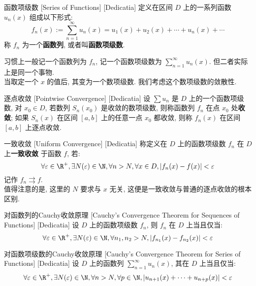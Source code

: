 \documentclass[UTF8]{ctexart}
\begin{document}
        \begin{dfn}
            [UUID]
            {函数项级数}
            [Series of Functions]
            [Dedicatia]
            定义在区间 \(D\) 上的一系列函数 \(u_n(x)\) 组成以下形式: \[f_n(x):=\sum_{n = 1}^{\infty} u_n(x)=u_1(x)+u_2(x)+\cdots+u_n(x)+\cdots \]
            称 \(f_n\) 为一个\textbf{函数列}, 或者叫\textbf{函数项级数}. 
        \end{dfn}

        习惯上一般记一个函数列为 \(f_n\), 记一个函数项级数为 \(\sum_{n = 1}^{\infty} u_n(x) \). 但二者实际上是同一个事物. \\
        当取定一个 \(x\) 的值后, 其变为一个数项级数. 我们考虑这个数项级数的敛散性. 
        
        \begin{dfn}
            [UUID]
            {逐点收敛}
            [Pointwise Convergence]
            [Dedicatia]
            设 \(\sum u_n\) 是 \(D\) 上的一个函数项级数, 对 \(x_0\in D\), 若数列 \(S_n(x_0)\) 是收敛的数项级数, 则称函数列 \(f_n\) 在点 \(x_0\) 处\textbf{收敛}; 如果 \(S_n(x)\) 在区间 \([a,b]\) 上的任意一点 \(x_0\) 都收敛, 则称 \(f_n(x)\) 在区间 \([a,b]\) 上逐点收敛. 
        \end{dfn}

        \begin{dfn}
            [UniformConvergence]
            {一致收敛}
            [Uniform Convergence]
            [Dedicatia]
            称定义在 \(D\) 上的函数项级数 \(f_n\) 在 \(D\) 上\textbf{一致收敛} 于函数 \(f\), 若: 
            \[\forall\varepsilon\in\R^+, \exists N(\varepsilon)\in\N, \forall n>N, \forall x\in D, |f_n(x)-f(x)|<\varepsilon\]
            记作 \(f_n\rightrightarrows f\).\\
            值得注意的是, 这里的 \(N\) 要求与 \(x\) 无关, 这便是一致收敛与普通的逐点收敛的根本区别. 
        \end{dfn}

        \begin{crl}
            [UUID]
            {对函数列的Cauchy收敛原理}
            [Cauchy's Convergence Theorem for Sequences of Functions]
            [Dedicatia]
            设 \(D\) 上的函数项级数 \(f_n\), 则 \(f_n\) 在 \(D\) 上\UniformConvergence 当且仅当: 
            \[\forall\varepsilon\in\R^+, \exists N(\varepsilon)\in\N, \forall n_1,n_2>N, |f_{n_1}(x)-f_{n_2}(x)|<\varepsilon\]
        \end{crl}

        \begin{crl}
            [UUID]
            {对函数项级数的Cauchy收敛原理}
            [Cauchy's Convergence Theorem for Series of Functions]
            [Dedicatia]
            设 \(D\) 上的函数列 \(\sum_{n=1}^{\infty} u_n(x)\), 其在 \(D\) 上\UniformConvergence 当且仅当: 
            \[\forall\varepsilon\in\R^+, \exists N(\varepsilon)\in\N, \forall n>N, \forall p\in\N, |u_{n+1}(x)+\cdots+u_{n+p}(x)|<\varepsilon\]
        \end{crl}
\end{document}
